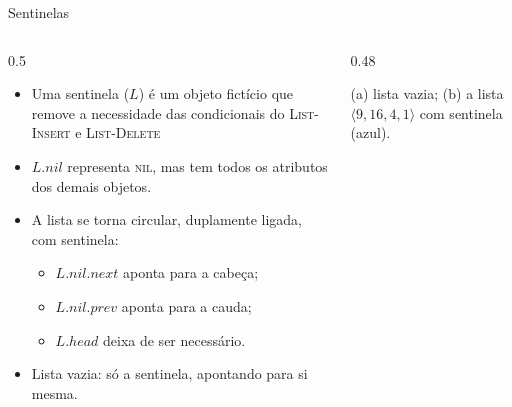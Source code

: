 \documentclass[aspectratio=169,10pt]{beamer}
\newcommand{\NIL}{\textnormal{\rmfamily\textsc{nil}}}
\newcommand{\proc}[1]{\textnormal{\rmfamily\textsc{#1}}}
\newcommand{\at}[1]{.\mathit{#1}}
\newcommand{\llnode}[4][]{%
  \node[ll,#1] (#2) at (#3)
    {\nodepart{one}\hspace{2mm}\nodepart{two}\makebox[4.5mm]{#4}%
     \nodepart{three}\hspace{2mm}};}
\newcommand{\llnext}[3][black]{%
  \draw[ptrdot, draw=#1] ($(#2.two split)!0.5!(#2.east)+(0,0.08)$)
     -- ($(#3.west)+(0,0.08)$);}
\newcommand{\llprev}[3][black]{%
  \draw[ptrdot, draw=#1] ($(#3.west)!0.5!(#3.one split)+(0,-0.08)$)
     -- ($(#2.east)+(0,-0.08)$);}
\newcommand{\lllink}[3][black]{\llnext[#1]{#2}{#3}\llprev[#1]{#2}{#3}}
\newcommand{\sentwrap}[3][black]{%
  \draw[ptrdot, draw=#1] ($(#3.two split)!0.5!(#3.east)+(0,0.08)$)
     -- ++(0.35,0) |- ($(#2.north)+(0,0.45)$) -- (#2.north);
  \draw[ptrdot, draw=#1] ($(#2.west)!0.5!(#2.one split)+(0,-0.08)$)
     -- ++(-0.35,0) |- ($(#3.south)+(0,-0.45)$) -- (#3.south);}
\begin{document}
\begin{frame}{Sentinelas}
  \begin{columns}[c]
    \begin{column}{0.5\textwidth}
      \begin{itemize}
        \item Uma \alert{sentinela} ($L$) é um objeto fictício que remove a necessidade das condicionais do \proc{List-Insert} e \proc{List-Delete}
        \item $L\at{nil}$ representa \NIL, mas tem todos os atributos dos demais objetos.
        \item A lista se torna \alert{circular, duplamente ligada, com sentinela}:
          \begin{itemize}
            \item $L\at{nil}\at{next}$ aponta para a cabeça;
            \item $L\at{nil}\at{prev}$ aponta para a cauda;
            \item $L\at{head}$ deixa de ser necessário.
          \end{itemize}
        \item Lista vazia: só a sentinela, apontando para si mesma.
      \end{itemize}
    \end{column}
    \begin{column}{0.48\textwidth}
      \centering

      {\scriptsize (a) lista vazia; (b) a lista $\langle 9,16,4,1\rangle$ com sentinela (azul).}
    \end{column}
  \end{columns}
\end{frame}
\end{document}
